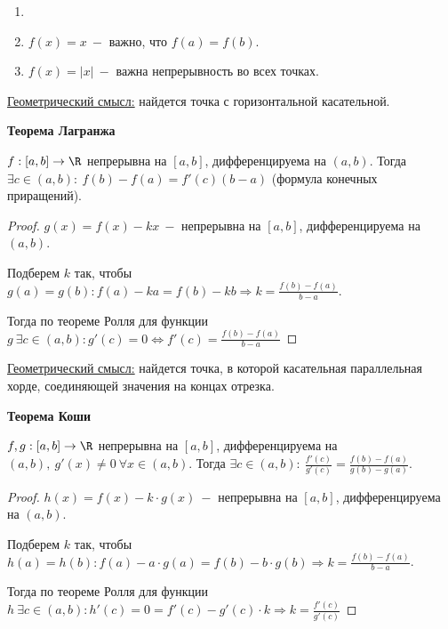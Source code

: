 \begin{example}
    \begin{enumerate}
        \item[]
        \item $f(x)=x\ -$ важно, что $f(a)=f(b)$.
        \item $f(x)=|x|\ -$ важна непрерывность во всех точках.
    \end{enumerate}
\end{example}

\begin{remark}
    \underline{Геометрический смысл:} найдется точка с горизонтальной касательной.
\end{remark}

\begin{theorem}
    \textbf{Теорема Лагранжа}

    $f:[a,b]\rightarrow \R$ непрерывна на $[a,b]$, дифференцируема на $(a,b)$. Тогда $\exists c\in (a,b):\ f(b)-f(a)=f'(c)(b-a)$ (формула конечных приращений).
\end{theorem}

\begin{proof}
    $g(x)=f(x)-kx\ -$ непрерывна на $[a,b]$, дифференцируема на $(a,b)$.

    Подберем $k$ так, чтобы $g(a)=g(b):f(a)-ka=f(b)-kb\Rightarrow k=\frac{f(b)-f(a)}{b-a}$.

    Тогда по теореме Ролля для функции $g\ \exists c\in (a,b): g'(c)=0\Leftrightarrow f'(c)=\frac{f(b)-f(a)}{b-a}$
\end{proof}

\begin{remark}
    \underline{Геометрический смысл:} найдется точка, в которой касательная параллельная хорде, соединяющей значения на концах отрезка.
\end{remark}

\begin{theorem}
    \textbf{Теорема Коши}

    $f,g:[a,b]\rightarrow \R$ непрерывна на $[a,b]$, дифференцируема на $(a,b),\ g'(x)\neq 0 \ \forall x \in (a,b)$. Тогда $\exists c\in (a,b):\ \frac{f'(c)}{g'(c)} = \frac{f(b)-f(a)}{g(b)-g(a)}$.
\end{theorem}

\begin{proof}
    $h(x)=f(x)-k\cdot g(x)\ -$ непрерывна на $[a,b]$, дифференцируема на $(a,b)$.

    Подберем $k$ так, чтобы $h(a)=h(b):f(a)-a\cdot g(a)=f(b)-b\cdot g(b)\Rightarrow k=\frac{f(b)-f(a)}{b-a}$.

    Тогда по теореме Ролля для функции $h\ \exists c\in (a,b):h'(c)=0=f'(c)-g'(c)\cdot k \Rightarrow k=\frac{f'(c)}{g'(c)}$
\end{proof}

